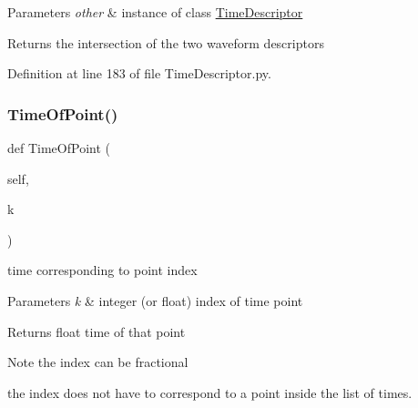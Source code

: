 \begin{DoxyParams}{Parameters}
{\em other} & instance of class \hyperlink{classSignalIntegrity_1_1TimeDomain_1_1Waveform_1_1TimeDescriptor_1_1TimeDescriptor}{Time\+Descriptor} \\
\hline
\end{DoxyParams}
\begin{DoxyReturn}{Returns}
the intersection of the two waveform descriptors 
\end{DoxyReturn}


Definition at line 183 of file Time\+Descriptor.\+py.

\mbox{\label{classSignalIntegrity_1_1TimeDomain_1_1Waveform_1_1TimeDescriptor_1_1TimeDescriptor_a424294098a65aea372b401299964e433}} 
\subsubsection{\texorpdfstring{Time\+Of\+Point()}{TimeOfPoint()}}
{\footnotesize\ttfamily def Time\+Of\+Point (\begin{DoxyParamCaption}\item[{}]{self,  }\item[{}]{k }\end{DoxyParamCaption})}



time corresponding to point index 


\begin{DoxyParams}{Parameters}
{\em k} & integer (or float) index of time point \\
\hline
\end{DoxyParams}
\begin{DoxyReturn}{Returns}
float time of that point 
\end{DoxyReturn}
\begin{DoxyNote}{Note}
the index can be fractional 

the index does not have to correspond to a point inside the list of times. 
\end{DoxyNote}


